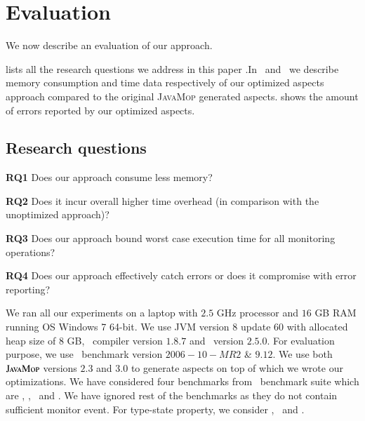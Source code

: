 \section{Evaluation}
\label{sec:evaluation}

We now describe an evaluation of our approach.

 lists all the research questions we address in this
paper .In~ and~ we
describe memory consumption and time data respectively of our optimized aspects approach compared to the original \textsc{JavaMop} generated aspects. 
 shows the amount of errors reported by our
optimized aspects.

\subsection{Research questions} 
\label{sec:evaluation:rq}

\begin{mybullet}
 \item[\textbf{RQ1}] Does our approach consume less memory?
\item[\textbf{RQ2}] Does it incur overall higher time overhead (in comparison
with the unoptimized approach)?
\item[\textbf{RQ3}] Does our approach bound worst case execution time for all
monitoring operations?
\item[\textbf{RQ4}] Does our approach effectively catch errors or
does it compromise with error reporting?
\end{mybullet}




We ran all our experiments on a laptop with $2.5$ GHz processor and $16$ GB RAM
running OS Windows 7 64-bit. We use JVM version $8$ update $60$ with allocated heap size of $8$ GB, \aspectj\ compiler version $1.8.7$ and
\soot\ version $2.5.0$. For evaluation purpose, we use \dacapo\
benchmark version $2006-10-MR2$ \& $9.12$. We use both $\textsc{JavaMop}$ versions
$2.3$ and $3.0$ to generate aspects on top of which we wrote our optimizations.
We have considered four benchmarks from \dacapo\ benchmark suite which
are \bloat, \pmd, \chart\ and \avrora. We have ignored rest of the benchmarks as
they do not contain sufficient monitor event. For type-state property, we
consider \hasnext, \unsafeiter\ and \hashset. 



